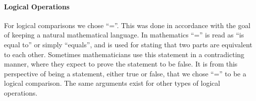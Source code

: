 
\paragraph{Logical Operations}
\label{sec:logicOps}

For logical comparisons we chose \enquote{=}. This was done in accordance with the goal of keeping a natural mathematical language. In mathematics \enquote{=} is read as \enquote{is equal to} or simply \enquote{equals}, and is used for stating that two parts are equivalent to each other. Sometimes mathematicians use this statement in a contradicting manner, where they expect to prove the statement to be false. It is from this perspective of being a statement, either true or false, that we chose \enquote{=} to be a logical comparison. The same arguments exist for other types of logical operations.

